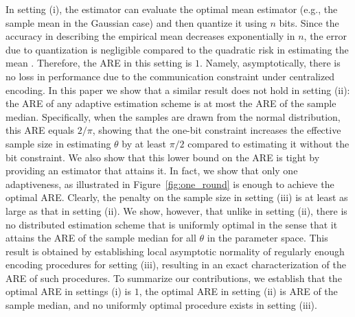 \documentclass[letterpaper, 11pt]{IEEEtran}      %
\begin{document}
In setting (i), the estimator can evaluate the optimal mean estimator (e.g., the sample mean in the Gaussian case) and then quantize it using $n$ bits. Since the accuracy in describing the empirical mean decreases exponentially in $n$, the error due to quantization is negligible compared to the quadratic risk in estimating the mean \cite{720540}. Therefore, the ARE in this setting is $1$. Namely, asymptotically, there is no loss in performance due to the communication constraint under centralized encoding. 
%
In this paper we show that a similar result does not hold in setting (ii): the ARE of any adaptive estimation scheme is at most the ARE of the sample median. Specifically, when the samples are drawn from the normal distribution, this ARE equals $2/\pi$, showing that the one-bit constraint increases the effective sample size in estimating $\theta$ by at least $\pi/2$ compared to estimating it without the bit constraint. We also show that this lower bound on the ARE is tight by providing an estimator that attains it. In fact, we show that only one adaptiveness, as illustrated in Figure~\ref{fig:one_round} is enough to achieve the optimal ARE. 
%
Clearly, the penalty on the sample size in setting (iii) is at least as large as that in setting (ii). We show, however, that unlike in setting (ii), there is no distributed estimation scheme that is uniformly optimal in the sense that it attains the ARE of the sample median for all $\theta$ in the parameter space. This result is obtained by establishing local asymptotic normality of regularly enough encoding procedures for setting (iii), resulting in an exact characterization of the ARE of such procedures. To summarize our contributions, we establish that the optimal ARE in settings (i) is $1$, the optimal ARE in setting (ii) is ARE of the sample median, and no uniformly optimal procedure exists in setting (iii). 

\end{document}

